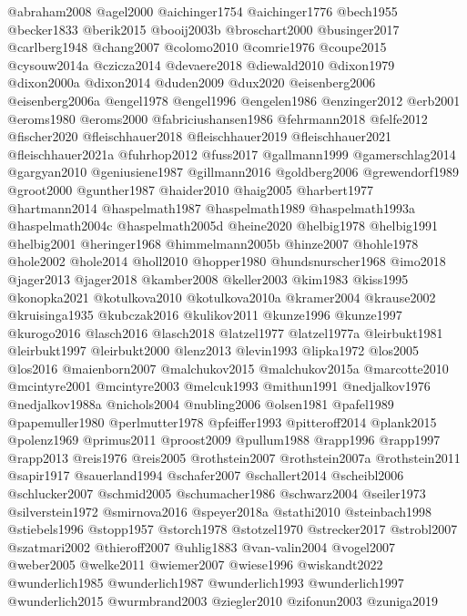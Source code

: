 @abraham2008
@agel2000
@aichinger1754
@aichinger1776
@bech1955
@becker1833
@berik2015
@booij2003b
@broschart2000
@businger2017
@carlberg1948
@chang2007
@colomo2010
@comrie1976
@coupe2015
@cysouw2014a
@czicza2014
@devaere2018
@diewald2010
@dixon1979
@dixon2000a
@dixon2014
@duden2009
@dux2020
@eisenberg2006
@eisenberg2006a
@engel1978
@engel1996
@engelen1986
@enzinger2012
@erb2001
@eroms1980
@eroms2000
@fabriciushansen1986
@fehrmann2018
@felfe2012
@fischer2020
@fleischhauer2018
@fleischhauer2019
@fleischhauer2021
@fleischhauer2021a
@fuhrhop2012
@fuss2017
@gallmann1999
@gamerschlag2014
@gargyan2010
@geniusiene1987
@gillmann2016
@goldberg2006
@grewendorf1989
@groot2000
@gunther1987
@haider2010
@haig2005
@harbert1977
@hartmann2014
@haspelmath1987
@haspelmath1989
@haspelmath1993a
@haspelmath2004c
@haspelmath2005d
@heine2020
@helbig1978
@helbig1991
@helbig2001
@heringer1968
@himmelmann2005b
@hinze2007
@hohle1978
@hole2002
@hole2014
@holl2010
@hopper1980
@hundsnurscher1968
@imo2018
@jager2013
@jager2018
@kamber2008
@keller2003
@kim1983
@kiss1995
@konopka2021
@kotulkova2010
@kotulkova2010a
@kramer2004
@krause2002
@kruisinga1935
@kubczak2016
@kulikov2011
@kunze1996
@kunze1997
@kurogo2016
@lasch2016
@lasch2018
@latzel1977
@latzel1977a
@leirbukt1981
@leirbukt1997
@leirbukt2000
@lenz2013
@levin1993
@lipka1972
@los2005
@los2016
@maienborn2007
@malchukov2015
@malchukov2015a
@marcotte2010
@mcintyre2001
@mcintyre2003
@melcuk1993
@mithun1991
@nedjalkov1976
@nedjalkov1988a
@nichols2004
@nubling2006
@olsen1981
@pafel1989
@papemuller1980
@perlmutter1978
@pfeiffer1993
@pitteroff2014
@plank2015
@polenz1969
@primus2011
@proost2009
@pullum1988
@rapp1996
@rapp1997
@rapp2013
@reis1976
@reis2005
@rothstein2007
@rothstein2007a
@rothstein2011
@sapir1917
@sauerland1994
@schafer2007
@schallert2014
@scheibl2006
@schlucker2007
@schmid2005
@schumacher1986
@schwarz2004
@seiler1973
@silverstein1972
@smirnova2016
@speyer2018a
@stathi2010
@steinbach1998
@stiebels1996
@stopp1957
@storch1978
@stotzel1970
@strecker2017
@strobl2007
@szatmari2002
@thieroff2007
@uhlig1883
@van-valin2004
@vogel2007
@weber2005
@welke2011
@wiemer2007
@wiese1996
@wiskandt2022
@wunderlich1985
@wunderlich1987
@wunderlich1993
@wunderlich1997
@wunderlich2015
@wurmbrand2003
@ziegler2010
@zifonun2003
@zuniga2019